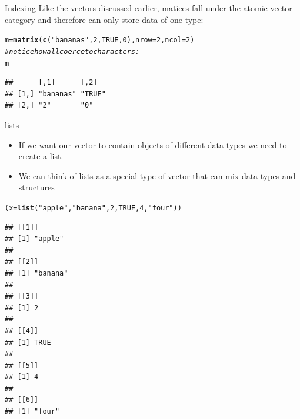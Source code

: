 \documentclass[xcolor=svgnames, 10pt]{beamer}
\makeatletter
\newcommand{\hlnum}[1]{\textcolor[rgb]{0.686,0.059,0.569}{#1}}%
\newcommand{\hlstr}[1]{\textcolor[rgb]{0.192,0.494,0.8}{#1}}%
\newcommand{\hlcom}[1]{\textcolor[rgb]{0.678,0.584,0.686}{\textit{#1}}}%
\newcommand{\hlstd}[1]{\textcolor[rgb]{0.345,0.345,0.345}{#1}}%
\newcommand{\hlkwb}[1]{\textcolor[rgb]{0.69,0.353,0.396}{#1}}%
\newcommand{\hlkwc}[1]{\textcolor[rgb]{0.333,0.667,0.333}{#1}}%
\newcommand{\hlkwd}[1]{\textcolor[rgb]{0.737,0.353,0.396}{\textbf{#1}}}%
\newenvironment{kframe}{%
 \def\at@end@of@kframe{}%
 \ifinner\ifhmode%
  \def\at@end@of@kframe{\end{minipage}}%
  \begin{minipage}{\columnwidth}%
 \fi\fi%
 \def\FrameCommand##1{\hskip\@totalleftmargin \hskip-\fboxsep
 \colorbox{shadecolor}{##1}\hskip-\fboxsep
     \hskip-\linewidth \hskip-\@totalleftmargin \hskip\columnwidth}%
 \MakeFramed {\advance\hsize-\width
   \@totalleftmargin\z@ \linewidth\hsize
   \@setminipage}}%
 {\par\unskip\endMakeFramed%
 \at@end@of@kframe}
\newenvironment{knitrout}{}{} %
\makeatother
\begin{document}
\begin{frame}[fragile]{Indexing}
Like the vectors discussed earlier, matices fall under the atomic vector category and therefore can only store data of one type:
\begin{knitrout}\footnotesize
{}\color{fgcolor}\begin{kframe}
\begin{alltt}
\hlstd{m} \hlkwb{=} \hlkwd{matrix}\hlstd{(}\hlkwd{c}\hlstd{(}\hlstr{"bananas"}\hlstd{,} \hlnum{2}\hlstd{,} \hlnum{TRUE}\hlstd{,} \hlnum{0}\hlstd{),}  \hlkwc{nrow}\hlstd{=}\hlnum{2}\hlstd{,} \hlkwc{ncol}\hlstd{=}\hlnum{2}\hlstd{)}
\hlcom{# notice how all coerce to characters:}
\hlstd{m}
\end{alltt}
\begin{verbatim}
##      [,1]      [,2]  
## [1,] "bananas" "TRUE"
## [2,] "2"       "0"
\end{verbatim}
\end{kframe}
\end{knitrout}
\end{frame}




\begin{frame}[fragile]{lists}
\begin{itemize}
\item
If we want our vector to contain objects of different data types we need to create a list.
\item We can think of lists as a special type of vector that can mix data types and  structures
\end{itemize}
\end{frame}

\begin{frame}[fragile]{}

\begin{knitrout}\scriptsize
{}\color{fgcolor}\begin{kframe}
\begin{alltt}
\hlstd{(x} \hlkwb{=} \hlkwd{list}\hlstd{(}\hlstr{"apple"}\hlstd{,} \hlstr{"banana"}\hlstd{,} \hlnum{2}\hlstd{,} \hlnum{TRUE}\hlstd{,} \hlnum{4}\hlstd{,} \hlstr{"four"}\hlstd{))}
\end{alltt}
\begin{verbatim}
## [[1]]
## [1] "apple"
## 
## [[2]]
## [1] "banana"
## 
## [[3]]
## [1] 2
## 
## [[4]]
## [1] TRUE
## 
## [[5]]
## [1] 4
## 
## [[6]]
## [1] "four"
\end{verbatim}
\end{kframe}
\end{knitrout}
\end{frame}
\end{document}
